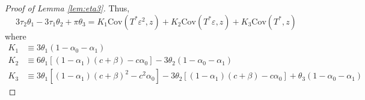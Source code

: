 \begin{proof}[Proof of Lemma \ref{lem:eta3}]
Thus, 
\[
  3\tau_2 \theta_1 - 3 \tau_1 \theta_2 + \pi \theta_3 = K_1 \mbox{Cov}(T^*\varepsilon^2,z) + K_2 \mbox{Cov}(T^*\varepsilon, z) + K_3 \mbox{Cov}(T^*,z)
\]
where
\begin{align*}
  K_1 &\equiv 3 \theta_1(1 - \alpha_0 - \alpha_1)\\ 
  K_2 &\equiv 6\theta_1 \left[(1 - \alpha_1)(c +\beta) - c\alpha_0\right] - 3\theta_2 (1 - \alpha_0 - \alpha_1) \\
  K_3 &\equiv 3\theta_1 \left[ (1 - \alpha_1)(c + \beta)^2 - c^2 \alpha_0 \right] - 3\theta_2 \left[ (1 - \alpha_1)(c + \beta) - c\alpha_0 \right] + \theta_3(1 - \alpha_0 - \alpha_1)

\end{align*}
\end{proof}
